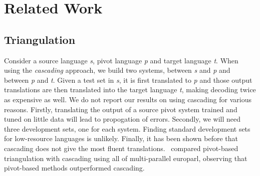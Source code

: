 \chapter{Related Work}
\label{chap:related_work}
\section{Triangulation}
Consider a source language \emph{s}, pivot language \emph{p} and target language \emph{t}. When using the \emph{cascading} approach, we build two systems, between \emph{s} and \emph{p} and between \emph{p} and \emph{t}. Given a test set in \emph{s}, it is first translated to \emph{p} and those output translations are then translated into the target language \emph{t}, making decoding twice as expensive as well. We do not report our results on using cascading for various reasons. Firstly, translating the output of a source pivot system trained and tuned on little data will lead to propogation of errors. Secondly, we will need three development sets, one for each system. Finding standard development sets for low-resource languages is unlikely. Finally, it has been shown before that cascading does not give the most fluent translations.~\cite{Utiyama:07} compared pivot-based triangulation with cascading using all of multi-parallel europarl, observing that pivot-based methods outperformed cascading.

